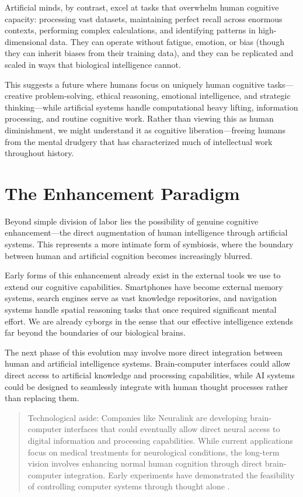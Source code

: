 Artificial minds, by contrast, excel at tasks that overwhelm human cognitive capacity: processing vast datasets, maintaining perfect recall across enormous contexts, performing complex calculations, and identifying patterns in high-dimensional data. They can operate without fatigue, emotion, or bias (though they can inherit biases from their training data), and they can be replicated and scaled in ways that biological intelligence cannot.

This suggests a future where humans focus on uniquely human cognitive tasks—creative problem-solving, ethical reasoning, emotional intelligence, and strategic thinking—while artificial systems handle computational heavy lifting, information processing, and routine cognitive work. Rather than viewing this as human diminishment, we might understand it as cognitive liberation—freeing humans from the mental drudgery that has characterized much of intellectual work throughout history.

\section{The Enhancement Paradigm}

Beyond simple division of labor lies the possibility of genuine cognitive enhancement—the direct augmentation of human intelligence through artificial systems. This represents a more intimate form of symbiosis, where the boundary between human and artificial cognition becomes increasingly blurred.

Early forms of this enhancement already exist in the external tools we use to extend our cognitive capabilities. Smartphones have become external memory systems, search engines serve as vast knowledge repositories, and navigation systems handle spatial reasoning tasks that once required significant mental effort. We are already cyborgs in the sense that our effective intelligence extends far beyond the boundaries of our biological brains.

The next phase of this evolution may involve more direct integration between human and artificial intelligence systems. Brain-computer interfaces could allow direct access to artificial knowledge and processing capabilities, while AI systems could be designed to seamlessly integrate with human thought processes rather than replacing them.

\begin{quote}\small
Technological aside: Companies like Neuralink are developing brain-computer interfaces that could eventually allow direct neural access to digital information and processing capabilities. While current applications focus on medical treatments for neurological conditions, the long-term vision involves enhancing normal human cognition through direct brain-computer integration. Early experiments have demonstrated the feasibility of controlling computer systems through thought alone \parencite{neuralink2021progress}.
\end{quote}


